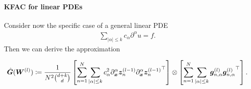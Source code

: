 \paragraph{KFAC for linear PDEs}

Consider now the specific case of a general linear PDE 
\begin{align}
    \sum_{\lvert \alpha \rvert\le k} c_\alpha \partial^\alpha u = f.
\end{align}
Then we can derive the approximation 
\begin{tcolorbox}[colframe=kfac, title={KFAC for ENGD for a general linear PDE},bottom=0mm,top=0mm,middle=0mm]
\begin{align*}\label{eq:KFAC-PINNs-general}
    \hat{\mG}%
    (\mW^{(l)})
    \coloneqq \frac{1}{N^2 \binom{d+k}{d}}
    \left[\sum_{n=1}^N \sum_{\lvert \alpha \rvert \le k} %
    c_\alpha^2\partial_\vx^\alpha \vz_n^{(l-1)} {\partial_\vx^\alpha \vz_n^{(l-1)}}^\top\right] 
    \otimes
    \left[\sum_{n=1}^N\sum_{\lvert \alpha \rvert \le k} \vg^{(l)}_{n,\alpha} {\vg^{(l)}_{n,\alpha}}^\top \right]. 
\end{align*}
\end{tcolorbox}

